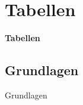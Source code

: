 \section{Tabellen}
\begin{frame}[c]
	\begin{center}
		\LARGE \textbf{Tabellen}
	\end{center}
\end{frame}
\subsection{Grundlagen}
\begin{frame}[c]
	\begin{center}
		\large Grundlagen
	\end{center}
\end{frame}
